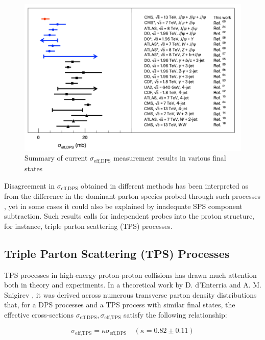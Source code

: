 \documentclass[10pt,twocolumn]{article}
\newcommand*{\effXsecDPS}{\sigma_{\text{eff,DPS}}}
\newcommand*{\effXsecTPS}{\sigma_{\text{eff,TPS}}}
\begin{document}
\begin{figure}
    \centering
    \includegraphics[width=1.0\linewidth]{images/sigma_eff_DPS_summary.png}
    \caption{Summary of current $\effXsecDPS$ measurement results in various final states\cite{CMS_TRI_JPSI}}
    \label{fig:sigma-eff-dps-summary}
\end{figure}

Disagreement in $\effXsecDPS$ obtained in different methods has been interpreted as from the difference in the dominant parton species probed through such processes \cite{MPI_at_LHC}, yet in some cases it could also be explained by inadequate SPS component subtraction. Such results calls for independent probes into the proton structure, for instance, triple parton scattering (TPS) processes.

\subsection{Triple Parton Scattering (TPS) Processes}

TPS processes in high-energy proton-proton collisions has drawn much attention both in theory and experiments. In a theoretical work by D. d'Enterria and A. M. Snigirev \cite{DdE_TPS}, it was derived across numerous transverse parton density distributions that, for a DPS processes and a TPS process with similar final states, the effective cross-sections $\effXsecDPS, \effXsecTPS$ satisfy the following relationship:

\begin{equation}
    \label{eqn:dps_tps_eff_xsec}
    \effXsecTPS = \kappa \effXsecDPS \quad (\kappa = 0.82 \pm 0.11)
\end{equation}
\end{document}

